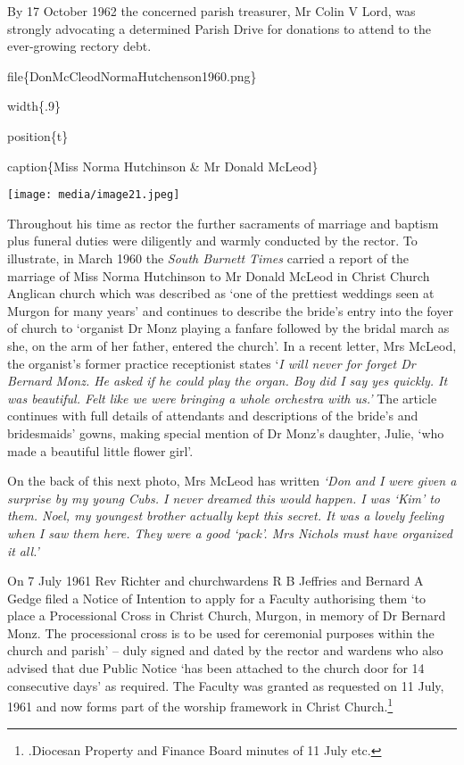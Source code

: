 By 17 October 1962 the concerned parish treasurer, Mr Colin V Lord, was
strongly advocating a determined Parish Drive for donations to attend to
the ever-growing rectory debt.

file\{DonMcCleodNormaHutchenson1960.png\}

width\{.9\}

position\{t\}

caption\{Miss Norma Hutchinson \& Mr Donald McLeod\}

\texttt{[image: media/image21.jpeg]}

Throughout his time as rector the further sacraments of marriage and
baptism plus funeral duties were diligently and warmly conducted by the
rector. To illustrate, in March 1960 the \emph{South Burnett Times}
carried a report of the marriage of Miss Norma Hutchinson to Mr Donald
McLeod in Christ Church Anglican church which was described as `one of
the prettiest weddings seen at Murgon for many years' and continues to
describe the bride's entry into the foyer of church to `organist Dr Monz
playing a fanfare followed by the bridal march as she, on the arm of her
father, entered the church'. In a recent letter, Mrs McLeod, the
organist's former practice receptionist states `\emph{I will never for
forget Dr Bernard Monz. He asked if he could play the organ. Boy did I
say yes quickly. It was beautiful. Felt like we were bringing a whole
orchestra with us.'} The article continues with full details of
attendants and descriptions of the bride's and bridesmaids' gowns,
making special mention of Dr Monz's daughter, Julie, `who made a
beautiful little flower girl'.

On the back of this next photo, Mrs McLeod has written \emph{`Don and I
were given a surprise by my young Cubs. I never dreamed this would
happen. I was `Kim' to them. Noel, my youngest brother actually kept
this secret. It was a lovely feeling when I saw them here. They were a
good `pack'. Mrs Nichols must have organized it} \emph{all.'}

On 7 July 1961 Rev Richter and churchwardens R B Jeffries and Bernard A
Gedge filed a Notice of Intention to apply for a Faculty authorising
them `to place a Processional Cross in Christ Church, Murgon, in memory
of Dr Bernard Monz. The processional cross is to be used for ceremonial
purposes within the church and parish' -- duly signed and dated by the
rector and wardens who also advised that due Public Notice `has been
attached to the church door for 14 consecutive days' as required. The
Faculty was granted as requested on 11 July, 1961 and now forms part of
the worship framework in Christ Church.\footnote{.Diocesan Property and
  Finance Board minutes of 11 July etc.}

